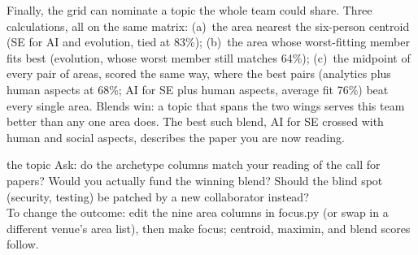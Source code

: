 Finally, the grid can nominate a topic the whole team could share.
Three calculations, all on the same matrix: (a)~the area nearest the
six-person centroid (SE for AI and evolution, tied at 83\%); (b)~the
area whose worst-fitting member fits best (evolution, whose worst
member still matches 64\%); (c)~the midpoint of every pair of areas,
scored the same way, where the best pairs (analytics plus human
aspects at 68\%; AI for SE plus human aspects, average fit 76\%) beat
every single area.
Blends win: a topic that spans the two wings serves this team better
than any one area does.
The best such blend, AI for SE crossed with human and social aspects,
describes the paper you are now reading.

\begin{pause}{the topic}
Ask: do the archetype columns match your reading of the call for
papers?
Would you actually fund the winning blend?
Should the blind spot (security, testing) be patched by a new
collaborator instead?\\[0.2em] To change the outcome: edit the nine
area columns in {\ttfamily focus.py} (or swap in a different venue's
area list), then {\ttfamily make focus}; centroid, maximin, and blend
scores follow.
\end{pause}
